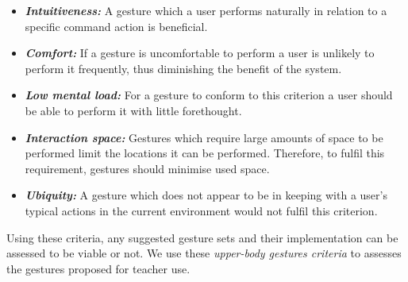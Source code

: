 \documentclass[manuscript, review, screen]{acmart}
\begin{document}
\begin{itemize}
\item \textit{\textbf{Intuitiveness:}} A gesture which a user performs naturally in relation to a specific command action is beneficial.
\item \textit{\textbf{Comfort:}} If a gesture is uncomfortable to perform a user is unlikely to perform it frequently, thus diminishing the benefit of the system.
\item \textit{\textbf{Low mental load:}} For a gesture to conform to this criterion a user should be able to perform it with little forethought.
\item \textit{\textbf{Interaction space:}} Gestures which require large amounts of space to be performed limit the locations it can be performed.
Therefore, to fulfil this requirement, gestures should minimise used space.
\item \textit{\textbf{Ubiquity:}} A gesture which does not appear to be in keeping with a user's typical actions in the current environment would not fulfil this criterion. \\ 
\end{itemize}

Using these criteria, any suggested gesture sets and their implementation can be assessed to be viable or not.
We use these \textit{upper-body gestures criteria} to assesses the gestures proposed for teacher use.



\end{document}
